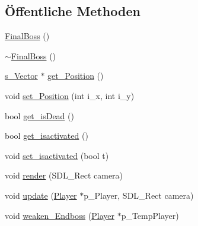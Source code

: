 \subsection*{Öffentliche Methoden}
\begin{DoxyCompactItemize}
\item 
\hyperlink{class_final_boss_a8c9af880c40bda93a29718d19bf5575d}{Final\-Boss} ()
\item 
\hyperlink{class_final_boss_a94c592906185ab51d36fc28a235a5a76}{$\sim$\-Final\-Boss} ()
\item 
\hyperlink{structs___vector}{s\-\_\-\-Vector} $\ast$ \hyperlink{class_final_boss_a6c30600b7492a40d2ec99874d41296b0}{get\-\_\-\-Position} ()
\item 
void \hyperlink{class_final_boss_a65029b764ec03a87caf71e7687d23306}{set\-\_\-\-Position} (int i\-\_\-x, int i\-\_\-y)
\item 
bool \hyperlink{class_final_boss_abacad04a4ff64dd94b3338b7cab122f2}{get\-\_\-is\-Dead} ()
\item 
bool \hyperlink{class_final_boss_aa0baaf57ed8bacb2174fbcc65b75cec9}{get\-\_\-isactivated} ()
\item 
void \hyperlink{class_final_boss_aa9ee8f4ddea7ecfc2d7b9bbaf6ca73a6}{set\-\_\-isactivated} (bool t)
\item 
void \hyperlink{class_final_boss_a0dfe88f2e430bd3a8760801809ab7c01}{render} (S\-D\-L\-\_\-\-Rect camera)
\item 
void \hyperlink{class_final_boss_a201e58c54ae09fbfd97bf6ef4fb2843f}{update} (\hyperlink{class_player}{Player} $\ast$p\-\_\-\-Player, S\-D\-L\-\_\-\-Rect camera)
\item 
void \hyperlink{class_final_boss_a1579fd9da81da66bbed75799f7113be9}{weaken\-\_\-\-Endboss} (\hyperlink{class_player}{Player} $\ast$p\-\_\-\-Temp\-Player)
\end{DoxyCompactItemize}

